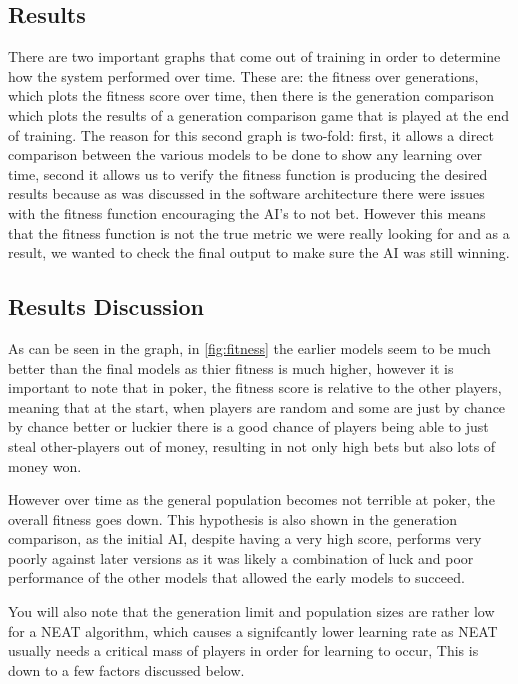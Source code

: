 \subsection{Results}
There are two important graphs that come out of training in order to determine how the system performed over
time. These are: the fitness over generations, which plots the fitness score over time, then there is the
generation comparison which plots the results of a generation comparison game that is played at the end of
training. The reason for this second graph is two-fold: first, it allows a direct comparison between the various
models to be done to show any learning over time, second it allows us to verify the fitness function is
producing the desired results because as was discussed in the software architecture there were issues with the
fitness function encouraging the AI's to not bet. However this means that the fitness function is not the true
metric we were really looking for and as a result, we wanted to check the final output to make sure the AI was
still winning.



\subsection{Results Discussion}
As can be seen in the graph, in \autoref{fig:fitness} the earlier models seem to be much better than the
final models as thier fitness is much higher, however it is important to note that in poker, the fitness
score is relative to the other players, meaning that at the start, when players are random and some are just by
chance by chance better or luckier there is a good chance of players being able to just steal other-players out
of money, resulting in not only high bets but also lots of money won.

However over time as the general population becomes not terrible at poker, the overall fitness goes down. This
hypothesis is also shown in the generation comparison, as the initial AI, despite having a very high score,
performs very poorly against later versions as it was likely a combination of luck and poor performance of the
other models that allowed the early models to succeed.

You will also note that the generation limit and population sizes are rather low for a NEAT algorithm, which
causes a signifcantly lower learning rate as NEAT usually needs a critical mass of players in order for learning
to occur, This is down to a few factors discussed below.

